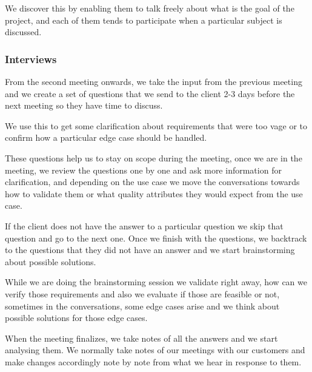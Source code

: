 \noindent We discover this by enabling them to talk freely about what is the 
goal of the project, and each of them tends to participate when a particular 
subject is discussed. \newline

\pagebreak
\subsubsection{Interviews}
From the second meeting onwards, we take the input from the previous meeting 
and we create a set of questions that we send to the client 2-3 days before 
the next meeting so they have time to discuss. \newline

\noindent We use this to get some clarification about requirements that were 
too vage or to confirm how a particular edge case should be handled. \newline

\noindent These questions help us to stay on scope during the meeting, once we 
are in the meeting, we review the questions one by one and ask more 
information for clarification, and depending on the use case we move the 
conversations towards how to validate them or what quality 
attributes they would expect from the use case. \newline

\noindent If the client does not have the answer to a particular question we 
skip that question and go to the next one. Once we finish with the questions, 
we backtrack to the questions that they did not have an answer and we start 
brainstorming about possible solutions.  \newline

\noindent While we are doing the brainstorming session we validate right 
away, how can we verify those requirements and also we evaluate if those are 
feasible or not, sometimes in the conversations, some edge cases arise and we 
think about possible solutions for those edge cases. \newline

\noindent When the meeting finalizes, we take notes of all the answers and we 
start analysing them. We normally take notes of our meetings with our 
customers and make changes accordingly note by note from what we hear in 
response to them.
